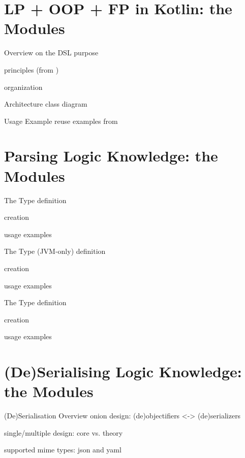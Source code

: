 \documentclass[handout]{beamer}
\begin{document}
\section{LP + OOP + FP in Kotlin: the  Modules}

\begin{frame}[allowframebreaks]{Overview on the DSL}
    purpose

    principles (from \cite{kotlinDSl4PrologWoa2020})

    organization
\end{frame}

\begin{frame}[allowframebreaks]{Architecture}
    class diagram
\end{frame}

\begin{frame}[allowframebreaks]{Usage Example}
    reuse examples from \cite{kotlinDSl4PrologWoa2020}
\end{frame}

\section{Parsing Logic Knowledge: the  Modules}

\begin{frame}[allowframebreaks]{The  Type}
    definition

    creation

    usage examples
\end{frame}

\begin{frame}[allowframebreaks]{The  Type (JVM-only)}
    definition

    creation

    usage examples
\end{frame}

\begin{frame}[allowframebreaks]{The  Type}
    definition

    creation

    usage examples
\end{frame}

\section{(De)Serialising Logic Knowledge: the  Modules}

\begin{frame}[allowframebreaks]{(De)Serialisation Overview}
    onion design: (de)objectifiers <-> (de)serializers

    single/multiple design: core vs. theory

    supported mime types: json and yaml
\end{frame}
\end{document}
